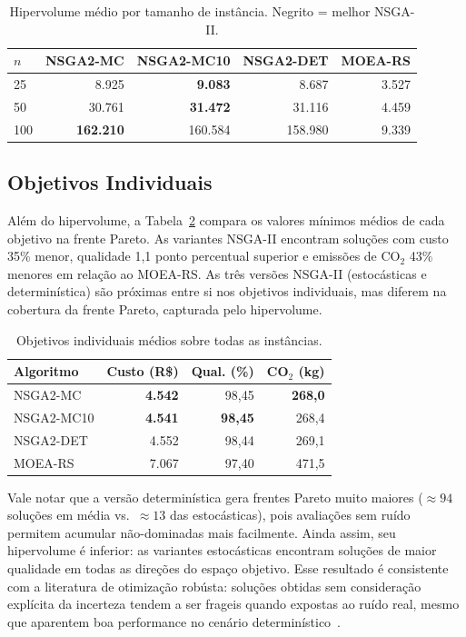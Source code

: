 \documentclass[a4paper,11pt]{article}
\newcommand{\nsmc}{NSGA2\mbox{-}MC\xspace}
\newcommand{\nsmx}{NSGA2\mbox{-}MC10\xspace}
\newcommand{\nsdet}{NSGA2\mbox{-}DET\xspace}
\newcommand{\moers}{MOEA\mbox{-}RS\xspace}
\begin{document}
\begin{table}[ht]
\centering
\caption{Hipervolume médio por tamanho de inst\^ancia. Negrito = melhor NSGA-II.}
\label{tab:hv_tamanho}
\begin{tabular}{lrrrr}
\toprule
$n$ & \textbf{\nsmc} & \textbf{\nsmx} & \textbf{\nsdet} & \textbf{\moers} \\
\midrule
  25 &  8.925 & \textbf{9.083} & 8.687 &  3.527 \\
  50 & 30.761 & \textbf{31.472} & 31.116 &  4.459 \\
 100 & \textbf{162.210} & 160.584 & 158.980 &  9.339 \\
\bottomrule
\end{tabular}
\end{table}

\subsection{Objetivos Individuais}

Além do hipervolume, a Tabela~\ref{tab:objetivos} compara os valores mínimos
médios de cada objetivo na frente Pareto.
As variantes NSGA-II encontram soluções com custo 35\% menor,
qualidade 1,1 ponto percentual superior e emissões de CO$_2$ 43\% menores
em relação ao \moers.
As tr\^es versões NSGA-II (estocásticas e determinística) são
próximas entre si nos objetivos individuais, mas diferem na cobertura da
frente Pareto, capturada pelo hipervolume.

\begin{table}[ht]
\centering
\caption{Objetivos individuais médios sobre todas as inst\^ancias.}
\label{tab:objetivos}
\small\begin{tabular}{lrrr}
\toprule
\textbf{Algoritmo} & \textbf{Custo (R\$)} & \textbf{Qual. (\%)} & \textbf{CO$_2$ (kg)} \\
\midrule
NSGA2-MC   & \textbf{4.542} & 98,45 & \textbf{268,0} \\
NSGA2-MC10 & \textbf{4.541} & \textbf{98,45} & 268,4 \\
NSGA2-DET  & 4.552 & 98,44 & 269,1 \\
MOEA-RS    & 7.067 & 97,40 & 471,5 \\
\bottomrule
\end{tabular}
\end{table}

Vale notar que a versão determinística gera frentes Pareto muito maiores
($\approx 94$ soluções em média vs.\ $\approx 13$ das estocásticas),
pois avaliações sem ruído permitem acumular não-dominadas mais facilmente.
Ainda assim, seu hipervolume é inferior: as variantes estocásticas encontram
soluções de maior qualidade em todas as direções do espaço objetivo.
Esse resultado é consistente com a literatura de otimização robústa:
soluções obtidas sem consideração explícita da incerteza tendem a ser
frageis quando expostas ao ruído real, mesmo que aparentem boa performance
no cenário determinístico~\citep{huang:2017}.
\end{document}
